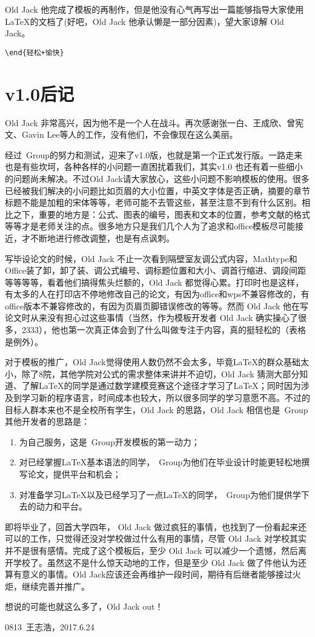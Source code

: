 Old Jack 他完成了模板的再制作，但是他没有心气再写出一篇能够指导大家使用\LaTeX 的文档了(好吧，Old Jack 他承认懒是一部分因素)，望大家谅解 Old Jack。

\verb!\end{轻松+愉快}!

\chapter{v1.0后记}

Old Jack 非常高兴，因为他不是一个人在战斗。再次感谢张一白、王成欣、曾宪文、Gavin Lee等人的工作，没有他们，\nuaathesis 不会像现在这么美丽。

经过\nuaathesis~Group的努力和测试，\nuaathesis 迎来了v1.0版，也就是第一个正式发行版。一路走来也是有些坎坷，各种各样的小问题一直困扰着我们，其实v1.0 也还有着一些细小的问题尚未解决。不过Old Jack请大家放心，这些小问题不影响模板的使用。很多已经被我们解决的小问题比如页眉的大小位置，中英文字体是否正确，摘要的章节标题不能是加粗的宋体等等，老师可能不去管这些，甚至注意不到有什么区别。相比之下，重要的地方是：公式、图表的编号，图表和文本的位置，参考文献的格式等等才是老师关注的点。很多地方只是我们几个人为了追求和office模板尽可能接近，才不断地进行修改调整，也是有点讽刺。

写毕设论文的时候，Old Jack 不止一次看到隔壁室友调公式内容，Mathtype和Office装了卸，卸了装、调公式编号、调标题位置和大小、调首行缩进、调段间距等等等等，看着他们搞得焦头烂额的，Old Jack 都觉得心累。打印时也是这样，有太多的人在打印店不停地修改自己的论文，有因为office和wps不兼容修改的，有office版本不兼容修改的，有因为页眉页脚错误修改的等等。然而 Old Jack 他在写论文时从来没有担心过这些事情（当然，作为模板开发者 Old Jack 确实操心了很多，2333），他也第一次真正体会到了什么叫做专注于内容，真的挺轻松的（表格是例外）。

对于模板的推广，Old Jack觉得使用人数仍然不会太多，毕竟\LaTeX 的群众基础太小，除了8院，其他学院对公式的需求整体来讲并不迫切，Old Jack 猜测大部分知道、了解\LaTeX 的同学是通过数学建模竞赛这个途径才学习了\LaTeX ；同时因为涉及到学习新的程序语言，时间成本也较大，所以很多同学的学习意愿不高。不过\nuaathesis 的目标人群本来也不是全校所有学生，Old Jack 的思路，Old Jack 相信也是\nuaathesis~Group其他开发者的思路是：
\begin{enumerate}
  \item 为自己服务，这是\nuaathesis~Group开发模板的第一动力；
  \item 对已经掌握\LaTeX 基本语法的同学，\nuaathesis~Group为他们在毕业设计时能更轻松地撰写论文，提供平台和机会；
  \item 对准备学习\LaTeX 以及已经学习了一点\LaTeX 的同学，\nuaathesis~Group为他们提供学下去的动力和平台。
\end{enumerate}

即将毕业了，回首大学四年， Old Jack 做过疯狂的事情，也找到了一份看起来还可以的工作，只觉得还没对学校做过什么有用的事情，尽管 Old Jack 对学校其实并不是很有感情。完成了这个模板后，至少 Old Jack 可以减少一个遗憾，然后离开学校了。虽然这不是什么惊天动地的工作，但是至少 Old Jack 做了件他认为还算有意义的事情。Old Jack应该还会再维护\nuaathesis 一段时间，期待有后继者能够接过火炬，继续完善并推广\nuaathesis 。

想说的可能也就这么多了，Old Jack out！

\hfill 0813~王志浩，2017.6.24
